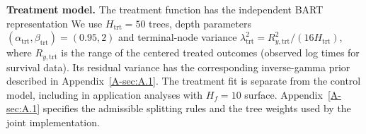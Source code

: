 \documentclass[11pt]{article}
\newcommand{\ind}{\mathbf{1}}
\theoremstyle{remark}\newtheorem{remark}{Remark}[section]
\providecommand{\DIFaddtex}[1]{{\protect\color{blue} \sf #1}} %
\providecommand{\DIFdeltex}[1]{{\protect\color{red} \scriptsize #1}} %
\providecommand{\DIFaddbegin}{} %
\providecommand{\DIFaddend}{} %
\providecommand{\DIFdelend}{} %
\providecommand{\DIFadd}[1]{\texorpdfstring{\DIFaddtex{#1}}{#1}} %
\providecommand{\DIFdel}[1]{\texorpdfstring{\DIFdeltex{#1}}{}} %
\begin{document}
\DIFdel{\textbf{Treatment model.}
The treatment function has the independent BART representation
}%
\DIFdel{We use $H_{\mathrm{trt}}=50$ trees, depth parameters $(\alpha_{\mathrm{trt}},\beta_{\mathrm{trt}})=(0.95,2)$ and terminal-node variance $\lambda_{\mathrm{trt}}^2=R_{y,\mathrm{trt}}^2/(16H_{\mathrm{trt}})$, where $R_{y,\mathrm{trt}}$ is the range of the centered treated outcomes (observed log times for survival data).
Its residual variance has the corresponding inverse-gamma prior described in Appendix~\ref{A-sec:A.1}. The treatment fit is separate from the control model, including in application analyses with $H_f=10$}\DIFdelend \DIFaddbegin \DIFadd{surface}\DIFaddend . \DIFaddbegin \DIFadd{Appendix~\ref{A-sec:A.1} specifies the admissible splitting rules and the tree weights used by the joint implementation.
}\DIFaddend 
\end{document}
